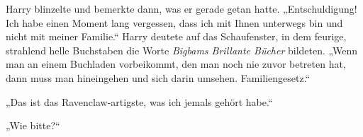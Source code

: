 Harry blinzelte und bemerkte dann, was er gerade getan hatte.
„Entschuldigung! Ich habe einen Moment lang vergessen, dass ich mit Ihnen unterwegs bin und nicht mit meiner Familie.“ Harry deutete auf das Schaufenster, in dem feurige, strahlend helle Buchstaben die Worte \emph{Bigbams Brillante Bücher} bildeten.
„Wenn man an einem Buchladen vorbeikommt, den man noch nie zuvor betreten hat, dann muss man hineingehen und sich darin umsehen. Familiengesetz.“

„Das ist das Ravenclaw-artigste, was ich jemals gehört habe.“

„Wie bitte?“

